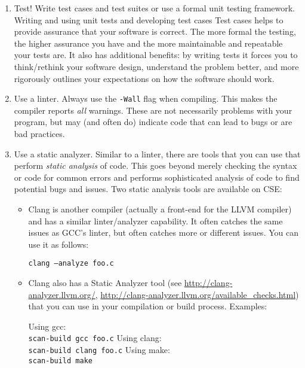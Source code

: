 \documentclass[12pt]{scrartcl}
\begin{document}
\begin{enumerate}
  \item Test!  Write test cases and test suites or use a formal
  unit testing framework.  Writing and using unit tests and developing
  test cases Test cases helps to provide assurance that your
  software is correct.  The more formal the testing, the higher assurance
  you have and the more maintainable and repeatable your tests are.
  It also has additional benefits: by writing tests it forces you to
  think/rethink your software design, understand the problem better, and
  more rigorously outlines your expectations on how the software should
  work.
  
  \item Use a linter.  Always use the \texttt{-Wall} flag 
  when compiling.  This makes the compiler reports \emph{all} warnings.
  These are not necessarily problems with your program, but may (and often
  do) indicate code that can lead to bugs or are bad practices.  

  \item Use a static analyzer.  Similar to a linter, there are tools that
  you can use that perform \emph{static analysis} of code.  This goes
  beyond merely checking the syntax or code for common errors and performs
  sophisticated analysis of code to find potential bugs and issues.  Two
  static analysis tools are available on CSE:
  \begin{itemize}
    \item Clang is another compiler (actually a front-end for the LLVM 
    compiler) and has a similar linter/analyzer capability.  It often
    catches the same issues as GCC's linter, but often catches more
    or different issues.  You can use it as follows:
    
    \texttt{clang --analyze foo.c}
    
    \item Clang also has a Static Analyzer tool (see 
    \url{http://clang-analyzer.llvm.org/}, 
    \url{http://clang-analyzer.llvm.org/available_checks.html})
    that you can use in your compilation or build process.  
    Examples:
    
    Using gcc: \\
    \texttt{scan-build gcc foo.c}
    Using clang: \\
    \texttt{scan-build clang foo.c}
    Using make: \\
    \texttt{scan-build make}


\end{itemize}
\end{enumerate}
\end{document}

